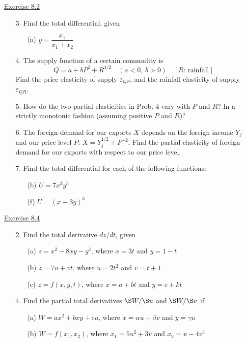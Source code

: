 \underline{Exercise 8.2}
\begin{enumerate}
\item[3.] Find the total differential, given
\begin{enumerate}
\item[(a)] $y=\dfrac{x_{1}}{x_{1}+x_{2}}$
\end{enumerate}

\item[4.] The supply function of a certain commodity is
\[Q=a+bP^{2}+R^{1/2} \quad (a<0,\ b>0) \quad [R\text{: rainfall}]\]
Find the price elasticity of supply $\varepsilon_{QP}$, and the rainfall elasticity of supply $\varepsilon_{QR}$.

\item[5.] How do the two partial elasticities in Prob. 4 vary with $P$ and $R$? In a strictly monotonic fashion (assuming positive $P$ and $R$)?

\item[6.] The foreign demand for our exports $X$ depends on the foreign income $Y_{f}$ and our price level $P$: $X=Y_{f}^{1/2}+P^{-2}$. Find the partial elasticity of foreign demand for our exports with respect to our price level.

\item[7.] Find the total differential for each of the following functions:
\begin{enumerate}
\item[(b)] $U=7x^{2}y^{3}$
\item[(f)] $U=(x-3y)^{3}$
\end{enumerate}

\end{enumerate}

\underline{Exercise 8.4}
\begin{enumerate}
\item[2.] Find the total derivative $dz/dt$, given
\begin{enumerate}
\item[(a)] $z=x^{2}-8xy-y^{3}$, where $x=3t$ and $y=1-t$
\item[(b)] $z=7u+vt$, where $u=2t^{2}$ and $v=t+1$
\item[(c)] $z=f(x,y,t)$, where $x=a+bt$ and $y=c+kt$
\end{enumerate}

\item[4.] Find the partial total derivatives $\S W/\S u$ and $\S W/\S v$ if
\begin{enumerate}
\item[(a)] $W=ax^{2}+bxy+cu$, where $x=\alpha u+\beta v$ and $y=\gamma u$
\item[(b)] $W=f\left(x_{1},x_{2}\right)$, where $x_{1}=5u^{2}+3v$ and $x_{2}=u-4v^{3}$
\end{enumerate}

\end{enumerate}
